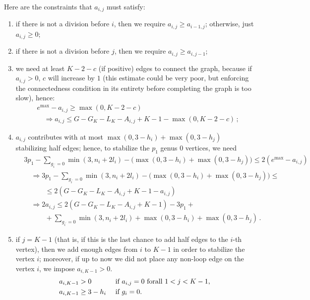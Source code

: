 \documentclass{amsart}
\theoremstyle{plain}
\theoremstyle{definition}
\DeclareMathOperator{\MAX}{max}
\begin{document}
Here are the constraints that $a_{i,j}$ must satisfy:
\begin{enumerate}
\item if there is not a division before $i$, then we require $a_{i,j}
  \geq a_{i-1,j}$; otherwise, just $a_{i,j} \geq 0$;
\item if there is not a division before $j$, then we require $a_{i,j}
  \geq a_{i,j-1}$;
\item we need at least $K-2-c$ (if positive) edges to connect the
  graph, because if $a_{i,j} > 0$, $c$ will increase by $1$ (this
  estimate could be very poor, but enforcing the connectedness
  condition in its entirety before completing the graph is too slow),
  hence:
  \begin{align*}
    &e^{\MAX} - a_{i,j} \geq \max(0, K-2-c)\\
    &\quad\Rightarrow a_{i,j} \leq G - G_K - L_K - A_{i,j} +K - 1 - \max(0, K-2-c)\,\text{;}
  \end{align*}
\item $a_{i,j}$ contributes with at most $\max(0, 3-h_i) + \max(0,
  3-h_j)$ stabilizing half edges; hence, to stabilize the $p_1$ genus
  $0$ vertices, we need
  \begin{align*}
    &3p_1 - \sum_{g_{i^\prime} = 0} \min(3, n_i + 2l_i) - \bigl(\max(0, 3-h_i) + \max(0, 3-h_j)\bigr) \leq 2 (e^{\MAX} - a_{i,j})\\
    &\quad\Rightarrow 3p_1 - \sum_{g_{i^\prime} = 0} \min(3, n_i + 2l_i) - \bigl(\max(0, 3-h_i) + \max(0, 3-h_j)\bigr) \leq \\
    &\quad\quad\quad \leq 2 (G - G_K - L_K - A_{i,j} + K - 1 - a_{i,j})\\
    &\quad\Rightarrow 2a_{i,j} \leq 2 (G - G_K - L_K - A_{i,j} + K - 1) - 3p_1 +\\
    &\quad\quad\quad +\sum_{g_{i^\prime} = 0} \min(3, n_i + 2l_i) + \max(0, 3-h_i) + \max(0, 3-h_j)\,\text{.}
  \end{align*}
\item if $j = K-1$ (that is, if this is the last chance to add half
  edges to the $i$-th vertex), then we add enough edges from $i$ to
  $K-1$ in order to stabilize the vertex $i$; moreover, if up to now
  we did not place any non-loop edge on the vertex $i$, we impose
  $a_{i,K-1} > 0$.
  \begin{align*}
    a_{i,K-1}&>0  &&\text{ if $ a_{i,j} = 0$ forall $1<j<K-1$,}\\
    a_{i,K-1}&\geq 3-h_i &&\text{ if $g_i = 0$.}
  \end{align*}
\end{enumerate}
\end{document}
